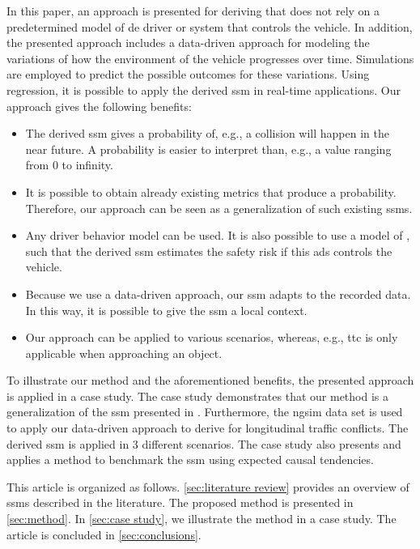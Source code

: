 In this paper, an approach is presented for deriving  that does not rely on a predetermined model of de driver or system that controls the vehicle. 
In addition, the presented approach includes a data-driven approach for modeling the variations of how the environment of the vehicle progresses over time.
Simulations are employed to predict the possible outcomes for these variations.
Using regression, it is possible to apply the derived \ac{ssm} in real-time applications.
Our approach gives the following benefits:
\begin{itemize}
	\item The derived \ac{ssm} gives a probability of, e.g., a collision will happen in the near future. 
	A probability is easier to interpret than, e.g., a value ranging from 0 to infinity.
	
	\item It is possible to obtain already existing metrics that produce a probability. 
	Therefore, our approach can be seen as a generalization of such existing \acp{ssm}.
	
	\item Any driver behavior model can be used.
	It is also possible to use a model of , such that the derived \ac{ssm} estimates the safety risk if this \ac{ads} controls the vehicle.
	
	\item Because we use a data-driven approach, our \ac{ssm} adapts to the recorded data. 
	In this way, it is possible to give the \ac{ssm} a local context.
	
	\item Our approach can be applied to various scenarios, whereas, e.g., \ac{ttc} is only applicable when approaching an object.
\end{itemize}

To illustrate our method and the aforementioned benefits, the presented approach is applied in a case study.
The case study demonstrates that our method is a generalization of the \ac{ssm} presented in \autocite{wang2014evaluation}.
Furthermore, the \ac{ngsim} data set \autocite{kovvali2007video} is used to apply our data-driven approach to derive  for longitudinal traffic conflicts.
The derived \ac{ssm} is applied in 3 different scenarios.
The case study also presents and applies a method to benchmark the \ac{ssm} using expected causal tendencies.

This article is organized as follows.
\cref{sec:literature review} provides an overview of \acp{ssm} described in the literature.
The proposed method is presented in \cref{sec:method}.
In \cref{sec:case study}, we illustrate the method in a case study.
The article is concluded in \cref{sec:conclusions}.
